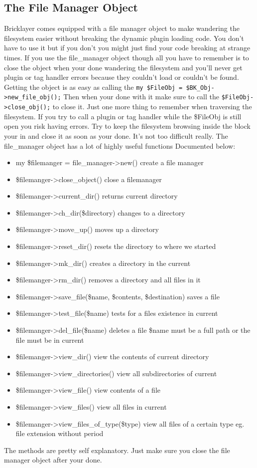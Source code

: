 \documentclass[letterpaper,10pt,oneside]{book}
\begin{document}
\subsection*{The File Manager Object}
Bricklayer comes equipped with a file manager object to make wandering the filesystem easier without breaking the dynamic plugin loading code. You don't have to use it but if you don't you might just find your code breaking at strange times. If you use the file\_manager object though all you have to remember is to close the object when your done wandering the filesystem and you'll never get plugin or tag handler errors because they couldn't load or couldn't be found. Getting the object is as easy as calling the 
\verb|my $FileObj = $BK_Obj->new_file_obj();|
Then when your done with it make sure to call the 
\verb|$FileObj->close_obj();|
to close it. Just one more thing to remember when traversing the filesystem. If you try to call a plugin or tag handler while the \$FileObj is still open you risk having errors. Try to keep the filesystem browsing inside the block your in and close it as soon as your done. It's not too difficult really. The file\_manager object has a lot of highly useful functions Documented below:
\begin{itemize}
	\item my \$filemanger = file\_manager->new() create a file manager
	\item \$filemanger->close\_object() close a filemanager
	\item \$filemanger->current\_dir() returns current directory
	\item \$filemanger->ch\_dir(\$directory) changes to a directory
	\item \$filemanger->move\_up() moves up a directory
	\item \$filemanger->reset\_dir() resets the directory to where we started
	\item \$filemanger->mk\_dir() creates a directory in the current
	\item \$filemanger->rm\_dir() removes a directory and all files in it
	\item \$filemanger->save\_file(\$name, \$contents, \$destination) saves a file
	\item \$filemanger->test\_file(\$name) tests for a files existence in current
	\item \$filemanger->del\_file(\$name) deletes a file \$name must be a full path or the file must be in current
	\item \$filemanger->view\_dir()  view the contents of current directory
	\item \$filemanger->view\_directories() view all subdirectories of current
	\item \$filemanger->view\_file() view contents of a file
	\item \$filemanger->view\_files() view all files in current
	\item \$filemanger->view\_files\_of\_type(\$type)  view all files of a certain type eg. file extension without period
\end{itemize}
The methods are pretty self explanatory. Just make sure you close the file manager object after your done.
\end{document}
